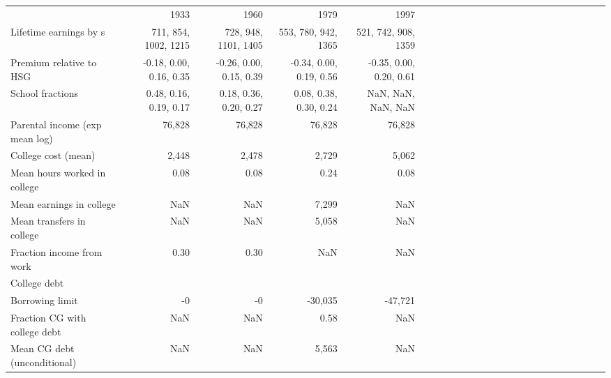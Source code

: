\begin{tabular}{lrrrrrrrrrrrrrrrrrrrrrrr}
\hline
 & 1933  & 1960  & 1979  & 1997  &   &   &   &   &   &   &   &   &   &   &   &   &   &   &   &   &   &   &   \\ 
Lifetime earnings by s & 711, 854, 1002, 1215  & 728, 948, 1101, 1405  & 553, 780, 942, 1365  & 521, 742, 908, 1359  &   &   &   &   &   &   &   &   &   &   &   &   &   &   &   &   &   &   &   \\ 
Premium relative to HSG & -0.18, 0.00, 0.16, 0.35  & -0.26, 0.00, 0.15, 0.39  & -0.34, 0.00, 0.19, 0.56  & -0.35, 0.00, 0.20, 0.61  &   &   &   &   &   &   &   &   &   &   &   &   &   &   &   &   &   &   &   \\ 
School fractions & 0.48, 0.16, 0.19, 0.17  & 0.18, 0.36, 0.20, 0.27  & 0.08, 0.38, 0.30, 0.24  & NaN, NaN, NaN, NaN  &   &   &   &   &   &   &   &   &   &   &   &   &   &   &   &   &   &   &   \\ 
Parental income (exp mean log) & 76,828  & 76,828  & 76,828  & 76,828  &   &   &   &   &   &   &   &   &   &   &   &   &   &   &   &   &   &   &   \\ 
College cost (mean) & 2,448  & 2,478  & 2,729  & 5,062  &   &   &   &   &   &   &   &   &   &   &   &   &   &   &   &   &   &   &   \\ 
Mean hours worked in college & 0.08  & 0.08  & 0.24  & 0.08  &   &   &   &   &   &   &   &   &   &   &   &   &   &   &   &   &   &   &   \\ 
Mean earnings in college & NaN  & NaN  & 7,299  & NaN  &   &   &   &   &   &   &   &   &   &   &   &   &   &   &   &   &   &   &   \\ 
Mean transfers in college & NaN  & NaN  & 5,058  & NaN  &   &   &   &   &   &   &   &   &   &   &   &   &   &   &   &   &   &   &   \\ 
Fraction income from work & 0.30  & 0.30  & NaN  & NaN  &   &   &   &   &   &   &   &   &   &   &   &   &   &   &   &   &   &   &   \\ 
College debt &   &   &   &   &   &   &   &   &   &   &   &   &   &   &   &   &   &   &   &   &   &   &   \\ 
Borrowing limit & -0  & -0  & -30,035  & -47,721  &   &   &   &   &   &   &   &   &   &   &   &   &   &   &   &   &   &   &   \\ 
Fraction CG with college debt & NaN  & NaN  & 0.58  & NaN  &   &   &   &   &   &   &   &   &   &   &   &   &   &   &   &   &   &   &   \\ 
Mean CG debt (unconditional) & NaN  & NaN  & 5,563  & NaN  &   &   &   &   &   &   &   &   &   &   &   &   &   &   &   &   &   &   &   \\ 
\hline
\end{tabular}%
